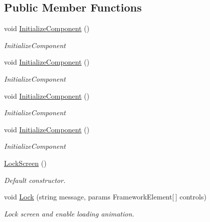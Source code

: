 \subsection*{Public Member Functions}
\begin{DoxyCompactItemize}
\item 
void \mbox{\hyperlink{class_wpf_handler_1_1_u_i_1_1_controls_1_1_lock_screen_aacd97a7da29eefb57cc695f5af31dce5}{Initialize\+Component}} ()
\begin{DoxyCompactList}\small\item\em Initialize\+Component \end{DoxyCompactList}\item 
void \mbox{\hyperlink{class_wpf_handler_1_1_u_i_1_1_controls_1_1_lock_screen_aacd97a7da29eefb57cc695f5af31dce5}{Initialize\+Component}} ()
\begin{DoxyCompactList}\small\item\em Initialize\+Component \end{DoxyCompactList}\item 
void \mbox{\hyperlink{class_wpf_handler_1_1_u_i_1_1_controls_1_1_lock_screen_aacd97a7da29eefb57cc695f5af31dce5}{Initialize\+Component}} ()
\begin{DoxyCompactList}\small\item\em Initialize\+Component \end{DoxyCompactList}\item 
void \mbox{\hyperlink{class_wpf_handler_1_1_u_i_1_1_controls_1_1_lock_screen_aacd97a7da29eefb57cc695f5af31dce5}{Initialize\+Component}} ()
\begin{DoxyCompactList}\small\item\em Initialize\+Component \end{DoxyCompactList}\item 
\mbox{\hyperlink{class_wpf_handler_1_1_u_i_1_1_controls_1_1_lock_screen_a9b03e106f5477ce912a76c7b7de5aac2}{Lock\+Screen}} ()
\begin{DoxyCompactList}\small\item\em Default constructor. \end{DoxyCompactList}\item 
void \mbox{\hyperlink{class_wpf_handler_1_1_u_i_1_1_controls_1_1_lock_screen_ae53cb9098b105a55f6da81acf3703e69}{Lock}} (string message, params Framework\+Element\mbox{[}$\,$\mbox{]} controls)
\begin{DoxyCompactList}\small\item\em Lock screen and enable loading animation. \end{DoxyCompactList}\item 

\end{DoxyCompactItemize}
